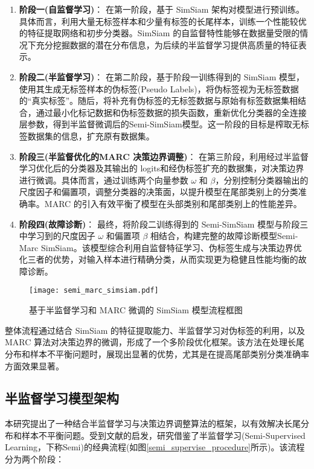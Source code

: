 \documentclass[master]{thesis-uestc}
\begin{document}
\begin{enumerate}[label={(\arabic*)}]
    \item \textbf{阶段一(自监督学习)}：  
    在第一阶段，基于 SimSiam 架构对模型进行预训练。具体而言，利用大量无标签样本和少量有标签的长尾样本，训练一个性能较优的特征提取网络和初步分类器。SimSiam 的自监督特性能够在数据量受限的情况下充分挖掘数据的潜在分布信息，为后续的半监督学习提供高质量的特征表示。

    \item \textbf{阶段二(半监督学习)}：  
    在第二阶段，基于阶段一训练得到的 SimSiam 模型，使用其生成无标签样本的伪标签(Pseudo Labels)，将伪标签视为无标签数据的“真实标签”。随后，将补充有伪标签的无标签数据与原始有标签数据集相结合，通过最小化标记数据和伪标签数据的损失函数，重新优化分类器的全连接层参数，得到半监督微调后的Semi-SimSiam模型。这一阶段的目标是榨取无标签数据集的信息，扩充原有数据集。

    \item \textbf{阶段三(半监督优化的MARC 决策边界调整)}：  
    在第三阶段，利用经过半监督学习优化后的分类器及其输出的 logits和经伪标签扩充的数据集，对决策边界进行微调。具体而言，通过训练两个向量参数 $\omega$ 和 $\beta$，分别控制分类器输出的尺度因子和偏置项，调整分类器的决策面，以提升模型在尾部类别上的分类准确率。MARC 的引入有效平衡了模型在头部类别和尾部类别上的性能差异。

    \item \textbf{阶段四(故障诊断)}：  
    最终，将阶段二训练得到的 Semi-SimSiam 模型与阶段三中学习到的尺度因子 $\omega$ 和偏置项 $\beta$ 相结合，构建完整的故障诊断模型Semi-Marc SimSiam。该模型综合利用自监督特征学习、伪标签生成与决策边界优化三者的优势，对输入样本进行精确分类，从而实现更为稳健且性能均衡的故障诊断。
\end{enumerate}

\begin{figure}[h]
    \centering
    \texttt{[image: semi\_marc\_simsiam.pdf]}
    \caption{基于半监督学习和 MARC 微调的 SimSiam 模型流程框图}
    \label{semi_marc_simsiam}
\end{figure}

整体流程通过结合 SimSiam 的特征提取能力、半监督学习对伪标签的利用，以及 MARC 算法对决策边界的微调，形成了一个多阶段优化框架。该方法在处理长尾分布和样本不平衡问题时，展现出显著的优势，尤其是在提高尾部类别分类准确率方面效果显著。
\FloatBarrier  %
\subsection{半监督学习模型架构}
本研究提出了一种结合半监督学习与决策边界调整算法的框架，以有效解决长尾分布和样本不平衡问题。受到文献\cite{yang2020rethinking,wang2023margin}的启发，研究借鉴了半监督学习(Semi-Supervised Learning，下称Semi)的经典流程(如图\ref{semi_supervise_procedure}所示)。该流程分为两个阶段：
\end{document}
